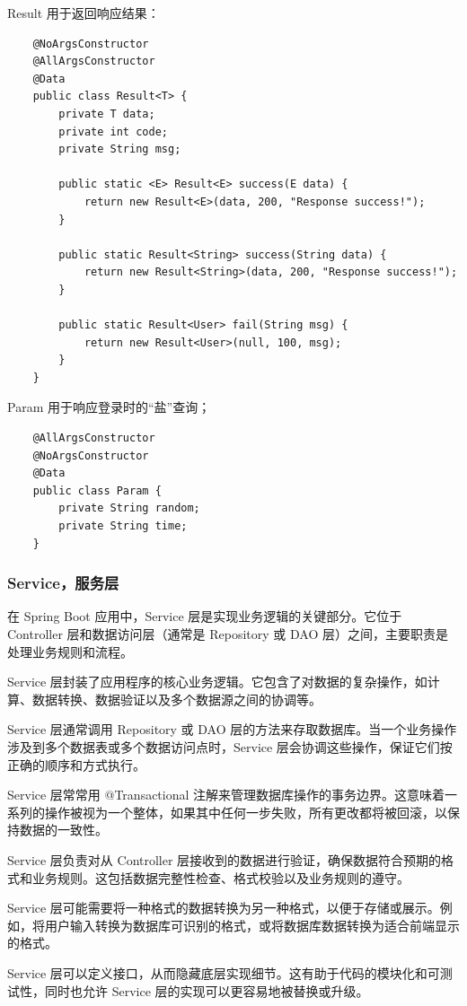 \documentclass{base}
\begin{document}
Result 用于返回响应结果：
\begin{verbatim}
	@NoArgsConstructor
	@AllArgsConstructor
	@Data
	public class Result<T> {
		private T data;
		private int code;
		private String msg;
		
		public static <E> Result<E> success(E data) {
			return new Result<E>(data, 200, "Response success!");
		}
		
		public static Result<String> success(String data) {
			return new Result<String>(data, 200, "Response success!");
		}
		
		public static Result<User> fail(String msg) {
			return new Result<User>(null, 100, msg);
		}
	}
\end{verbatim}

Param 用于响应登录时的“盐”查询；
\begin{verbatim}
	@AllArgsConstructor
	@NoArgsConstructor
	@Data
	public class Param {
		private String random;
		private String time;
	}
\end{verbatim}


\subsubsection{Service，服务层}

在 Spring Boot 应用中，Service 层是实现业务逻辑的关键部分。它位于 Controller 层和数据访问层（通常是 Repository 或 DAO 层）之间，主要职责是处理业务规则和流程。

Service 层封装了应用程序的核心业务逻辑。它包含了对数据的复杂操作，如计算、数据转换、数据验证以及多个数据源之间的协调等。

Service 层通常调用 Repository 或 DAO 层的方法来存取数据库。当一个业务操作涉及到多个数据表或多个数据访问点时，Service 层会协调这些操作，保证它们按正确的顺序和方式执行。

Service 层常常用 @Transactional 注解来管理数据库操作的事务边界。这意味着一系列的操作被视为一个整体，如果其中任何一步失败，所有更改都将被回滚，以保持数据的一致性。

Service 层负责对从 Controller 层接收到的数据进行验证，确保数据符合预期的格式和业务规则。这包括数据完整性检查、格式校验以及业务规则的遵守。

Service 层可能需要将一种格式的数据转换为另一种格式，以便于存储或展示。例如，将用户输入转换为数据库可识别的格式，或将数据库数据转换为适合前端显示的格式。

Service 层可以定义接口，从而隐藏底层实现细节。这有助于代码的模块化和可测试性，同时也允许 Service 层的实现可以更容易地被替换或升级。
\end{document}
